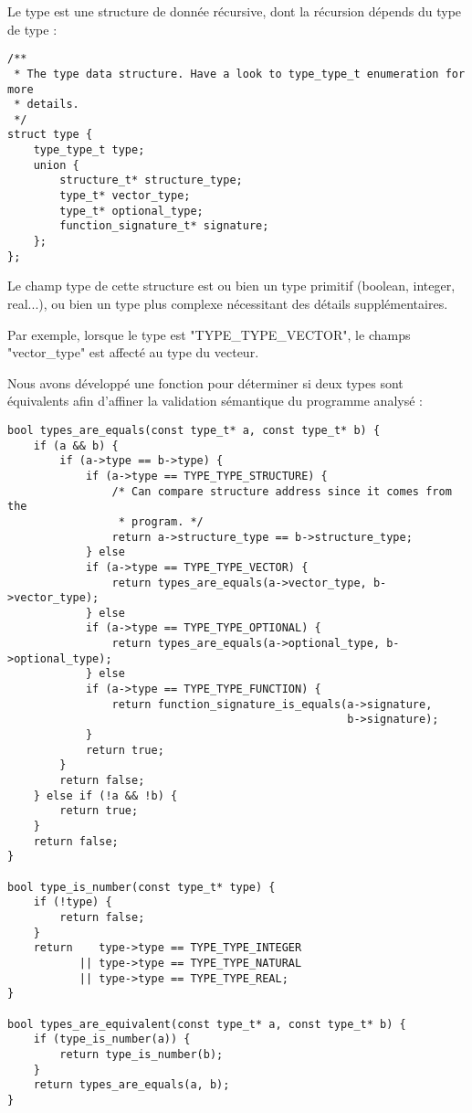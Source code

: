 Le type est une structure de donnée récursive, dont la récursion dépends du
type de type :
\begin{verbatim}
/**
 * The type data structure. Have a look to type_type_t enumeration for more
 * details.
 */
struct type {
    type_type_t type;
    union {
        structure_t* structure_type;
        type_t* vector_type;
        type_t* optional_type;
        function_signature_t* signature;
    };
};
\end{verbatim}

Le champ type de cette structure est ou bien un type primitif (boolean,
integer, real...), ou bien un type plus complexe nécessitant des détails
supplémentaires.

Par exemple, lorsque le type est "TYPE\_TYPE\_VECTOR", le champs "vector\_type"
est affecté au type du vecteur.

Nous avons développé une fonction pour déterminer si deux types sont équivalents
afin d'affiner la validation sémantique du programme analysé :
\begin{verbatim}
bool types_are_equals(const type_t* a, const type_t* b) {
    if (a && b) {
        if (a->type == b->type) {
            if (a->type == TYPE_TYPE_STRUCTURE) {
                /* Can compare structure address since it comes from the
                 * program. */
                return a->structure_type == b->structure_type;
            } else
            if (a->type == TYPE_TYPE_VECTOR) {
                return types_are_equals(a->vector_type, b->vector_type);
            } else
            if (a->type == TYPE_TYPE_OPTIONAL) {
                return types_are_equals(a->optional_type, b->optional_type);
            } else
            if (a->type == TYPE_TYPE_FUNCTION) {
                return function_signature_is_equals(a->signature,
                                                    b->signature);
            }
            return true;
        }
        return false;
    } else if (!a && !b) {
        return true;
    }
    return false;
}

bool type_is_number(const type_t* type) {
    if (!type) {
        return false;
    }
    return    type->type == TYPE_TYPE_INTEGER
           || type->type == TYPE_TYPE_NATURAL
           || type->type == TYPE_TYPE_REAL;
}

bool types_are_equivalent(const type_t* a, const type_t* b) {
    if (type_is_number(a)) {
        return type_is_number(b);
    }
    return types_are_equals(a, b);
}
\end{verbatim}

